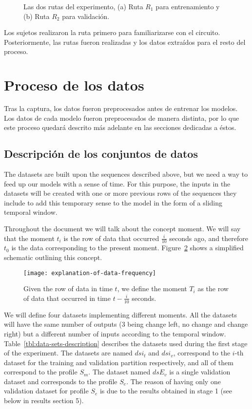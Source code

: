 \begin{figure}
	\centering
	\qquad
	\caption{Las dos rutas del experimento, (a) Ruta $R_1$ para entrenamiento y (b) Ruta $R_2$ para validación.}
	\label{fig:proposed-routes}
\end{figure}

Los sujetos realizaron la ruta primero para familiarizarse con el circuito. Posteriormente, las rutas fueron realizadas y los datos extraídos para el resto del proceso.

\section{Proceso de los datos}

Tras la captura, los datos fueron preprocesados antes de entrenar los modelos. Los datos de cada modelo fueron preprocesados de manera distinta, por lo que este proceso quedará descrito más adelante en las secciones dedicadas a éstos.

\subsection{Descripción de los conjuntos de datos}

The datasets are built upon the sequences described above, but we need a way to feed up our models with a sense of time. For this purpose, the inputs in the datasets will be created with one or more previous rows of the sequences they include to add this temporary sense to the model in the form of a sliding temporal window.

Throughout the document we will talk about the concept moment. We will say that the moment $t_i$ is the row of data that occurred $\frac{i}{10}$ seconds ago, and therefore $t_0$ is the data corresponding to the present moment. Figure~\ref{fig:explanation-of-data-frequency} shows a simplified schematic outlining this concept.

\begin{figure}
	\texttt{[image: explanation-of-data-frequency]}
	\caption{Given the row of data in time $t$, we define the moment $T_i$ as the row of data that occurred in time $t - \frac{i}{10}$ seconds.}
	\label{fig:explanation-of-data-frequency}
\end{figure}

We will define four datasets implementing different moments. All the datasets will have the same number of outputs (3 being change left, no change and change right) but a different number of inputs according to the temporal window. Table~\ref{tbl:data-sets-description} describes the datasets used during the first stage of the experiment. The datasets are named $dsi_t$ and $dsi_v$, correspond to the $i$-th dataset for the training and validation partition respectively, and all of them correspond to the profile $S_m$. The dataset named $dsE_v$ is a single validation dataset and corresponds to the profile $S_e$. The reason of having only one validation dataset for profile $S_e$ is due to the results obtained in stage 1 (see below in results section 5).

